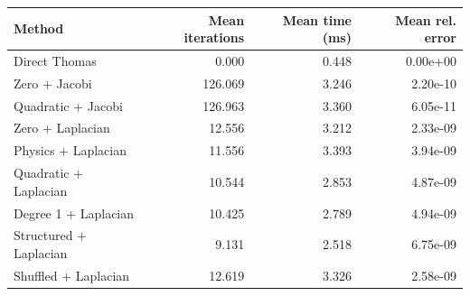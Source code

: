 \begin{tabular}{lrrr}
\toprule
Method & Mean iterations & Mean time (ms) & Mean rel. error \\
\midrule
Direct Thomas & 0.000 & 0.448 & 0.00e+00 \\
Zero + Jacobi & 126.069 & 3.246 & 2.20e-10 \\
Quadratic + Jacobi & 126.963 & 3.360 & 6.05e-11 \\
Zero + Laplacian & 12.556 & 3.212 & 2.33e-09 \\
Physics + Laplacian & 11.556 & 3.393 & 3.94e-09 \\
Quadratic + Laplacian & 10.544 & 2.853 & 4.87e-09 \\
Degree 1 + Laplacian & 10.425 & 2.789 & 4.94e-09 \\
Structured + Laplacian & 9.131 & 2.518 & 6.75e-09 \\
Shuffled + Laplacian & 12.619 & 3.326 & 2.58e-09 \\
\bottomrule
\end{tabular}
